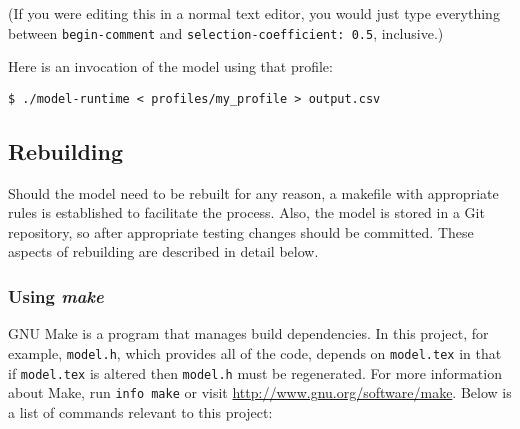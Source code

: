 \documentclass{article}
\begin{document}
	(If you were editing this in a normal text editor, you would just type
	everything between \verb|begin-comment| and \verb|selection-coefficient: 0.5|,
	inclusive.)
	
        Here is an invocation of the model using that profile:

        \begin{verbatim}
$ ./model-runtime < profiles/my_profile > output.csv
        \end{verbatim}

    \subsection{Rebuilding}
      \label{sec:rebuilding}
    
      Should the model need to be rebuilt for any reason, a makefile with
      appropriate rules is established to facilitate the process. Also, the
      model is stored in a Git repository, so after appropriate testing changes
      should be committed. These aspects of rebuilding are described in detail
      below.

      \subsubsection{Using {\em make}}
        \label{sec:make}

        GNU Make is a program that manages build dependencies. In this project,
        for example, \verb|model.h|, which provides all of the code, depends on
        \verb|model.tex| in that if \verb|model.tex| is altered then
        \verb|model.h| must be regenerated. For more information about Make, run
        \verb|info make| or visit \url{http://www.gnu.org/software/make}. Below
        is a list of commands relevant to this project:
\end{document}
